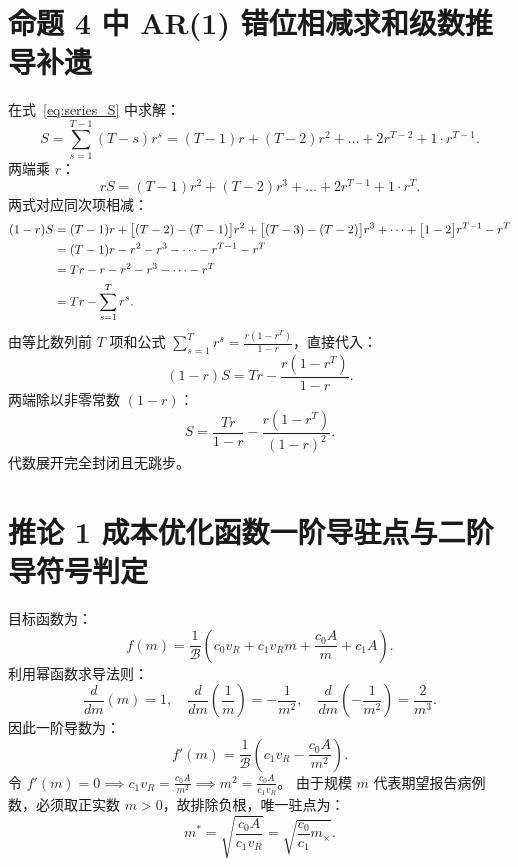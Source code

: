 \section{命题 4 中 AR(1) 错位相减求和级数推导补遗}\label{app:sec_prop4_ar1}
在式~\eqref{eq:series_S} 中求解：
\begin{equation}
S = \sum_{s=1}^{T-1} (T - s) r^s = (T-1)r + (T-2)r^2 + \dots + 2 r^{T-2} + 1 \cdot r^{T-1}.
\end{equation}
两端乘 $r$：
\begin{equation}
r S = (T-1)r^2 + (T-2)r^3 + \dots + 2 r^{T-1} + 1 \cdot r^T.
\end{equation}
两式对应同次项相减：
\begin{align}
(1 - r) S &= (T-1)r + \big[ (T-2) - (T-1) \big] r^2 + \big[ (T-3) - (T-2) \big] r^3 + \dots + \big[ 1 - 2 \big] r^{T-1} - r^T \notag \\
&= (T-1)r - r^2 - r^3 - \dots - r^{T-1} - r^T \notag \\
&= Tr - r - r^2 - r^3 - \dots - r^T \notag \\
&= Tr - \sum_{s=1}^T r^s.
\end{align}
由等比数列前 $T$ 项和公式 $\sum_{s=1}^T r^s = \frac{r(1 - r^T)}{1 - r}$，直接代入：
\begin{equation}
(1 - r) S = Tr - \frac{r(1 - r^T)}{1 - r}.
\end{equation}
两端除以非零常数 $(1 - r)$：
\begin{equation}
S = \frac{Tr}{1 - r} - \frac{r(1 - r^T)}{(1 - r)^2}.
\end{equation}
代数展开完全封闭且无跳步。

\section{推论 1 成本优化函数一阶导驻点与二阶导符号判定}\label{app:sec_cor1_convex}
目标函数为：
\begin{equation}
f(m) = \frac{1}{\mathcal{B}} \left( c_0 v_R + c_1 v_R m + \frac{c_0 A}{m} + c_1 A \right).
\end{equation}
利用幂函数求导法则：
\begin{equation}
\frac{d}{dm}(m) = 1, \quad \frac{d}{dm}\left( \frac{1}{m} \right) = -\frac{1}{m^2}, \quad \frac{d}{dm}\left( -\frac{1}{m^2} \right) = \frac{2}{m^3}.
\end{equation}
因此一阶导数为：
\begin{equation}
f'(m) = \frac{1}{\mathcal{B}} \left( c_1 v_R - \frac{c_0 A}{m^2} \right).
\end{equation}
令 $f'(m) = 0 \implies c_1 v_R = \frac{c_0 A}{m^2} \implies m^2 = \frac{c_0 A}{c_1 v_R}$。
由于规模 $m$ 代表期望报告病例数，必须取正实数 $m > 0$，故排除负根，唯一驻点为：
\begin{equation}
m^* = \sqrt{\frac{c_0 A}{c_1 v_R}} = \sqrt{\frac{c_0}{c_1} m_\times}.
\end{equation}

